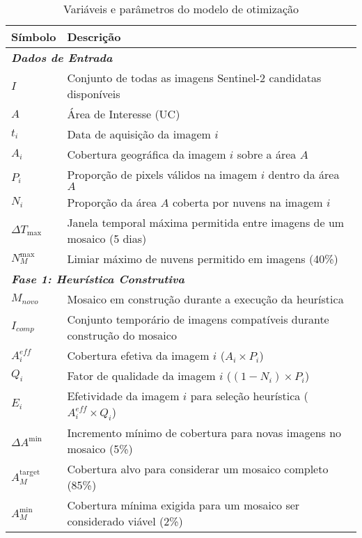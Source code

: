 \documentclass[a4paper,11pt]{article}
\begin{document}
\vspace{-10mm}

\begin{table}[ht!]
    \centering
    \caption{Variáveis e parâmetros do modelo de otimização}
    \label{tab:notation}
    \begin{tabular}{p{2.5cm}p{11.5cm}}
        \toprule
        \textbf{Símbolo} & \textbf{Descrição} \\
        \midrule
        \multicolumn{2}{l}{\footnotesize\textit{\textbf{Dados de Entrada}}} \\
        \midrule
        $I$        & Conjunto de todas as imagens Sentinel-2 candidatas disponíveis \\
        $A$        & Área de Interesse (UC) \\
        $t_i$      & Data de aquisição da imagem $i$ \\
        $A_i$      & Cobertura geográfica da imagem $i$ sobre a área $A$ \\
        $P_i$      & Proporção de pixels válidos na imagem $i$ dentro da área $A$ \\
        $N_i$      & Proporção da área $A$ coberta por nuvens na imagem $i$ \\
        $\Delta T_{\max}$ & Janela temporal máxima permitida entre imagens de um mosaico (5 dias) \\
        $N_M^{\max}$ & Limiar máximo de nuvens permitido em imagens (40\%) \\[1pt]
        \midrule
        \multicolumn{2}{l}{\footnotesize\textit{\textbf{Fase 1: Heurística Construtiva}}} \\
        \midrule
        $M_{novo}$ & Mosaico em construção durante a execução da heurística \\
        $I_{comp}$ & Conjunto temporário de imagens compatíveis durante construção do mosaico \\
        $A_i^{eff}$ & Cobertura efetiva da imagem $i$ ($A_i \times P_i$) \\
        $Q_i$      & Fator de qualidade da imagem $i$ ($(1 - N_i) \times P_i$) \\
        $E_i$      & Efetividade da imagem $i$ para seleção heurística ($A_i^{eff} \times Q_i$) \\
        $\Delta A^{\min}$ & Incremento mínimo de cobertura para novas imagens no mosaico (5\%)\\
        $A_M^{\text{target}}$ & Cobertura alvo para considerar um mosaico completo (85\%) \\
        $A_M^{\min}$ & Cobertura mínima exigida para um mosaico ser considerado viável (2\%) \\[1pt]

\end{tabular}
\end{table}
\end{document}
